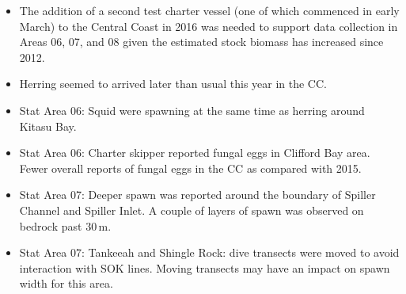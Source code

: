 \begin{itemize}
\item The addition of a second test charter vessel (one of which commenced in early March) to the Central Coast in 2016 was needed to support data collection in Areas 06, 07, and 08 given the estimated stock biomass has increased since 2012.
\item Herring seemed to arrived later than usual this year in the CC.
\item Stat Area 06: Squid were spawning at the same time as herring around Kitasu Bay.
\item Stat Area 06: Charter skipper reported fungal eggs in Clifford Bay area.
Fewer overall reports of fungal eggs in the CC as compared with 2015.
\item Stat Area 07: Deeper spawn was reported around the boundary of Spiller Channel and Spiller Inlet.
A couple of layers of spawn was observed on bedrock past $30\,\text{m}$.
\item Stat Area 07: Tankeeah and Shingle Rock: dive transects were moved to avoid interaction with SOK lines. 
Moving transects may have an impact on spawn width for this area.
\end{itemize}